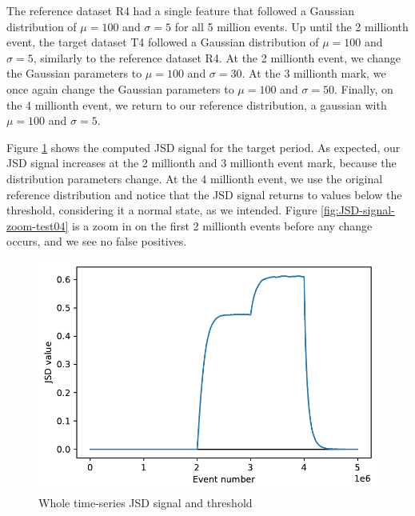 \documentclass[sigconf]{acmart}
\begin{document}
The reference dataset R4 had a single feature that followed a Gaussian distribution of $\mu=100$ and $\sigma=5$ for all 5 million events. Up until the 2 millionth event, the target dataset T4 followed a Gaussian distribution of $\mu=100$ and $\sigma=5$, similarly to the reference dataset R4. At the 2 millionth event, we change the Gaussian parameters to $\mu=100$ and $\sigma=30$. At the 3 millionth mark, we once again change the Gaussian parameters to $\mu=100$ and $\sigma=50$. Finally, on the 4 millionth event, we return to our reference distribution, a gaussian with $\mu=100$ and $\sigma=5$.

Figure \ref{fig:JSD-signal-test04} shows the computed JSD signal for the target period. As expected, our JSD signal increases at the 2 millionth and 3 millionth event mark, because the distribution parameters change. At the 4 millionth event, we use the original reference distribution and notice that the JSD signal returns to values below the threshold, considering it a normal state, as we intended. Figure \ref{fig:JSD-signal-zoom-test04} is a zoom in on the first 2 millionth events before any change occurs, and we see no false positives.
\begin{figure}[!htb]
    \begin{center}
      \includegraphics[scale=0.5]{figures/stream-analysis-viz-test04.pdf}
      \caption{Whole time-series JSD signal and threshold}
      \label{fig:JSD-signal-test04}
    \end{center}
\end{figure}
\end{document}
